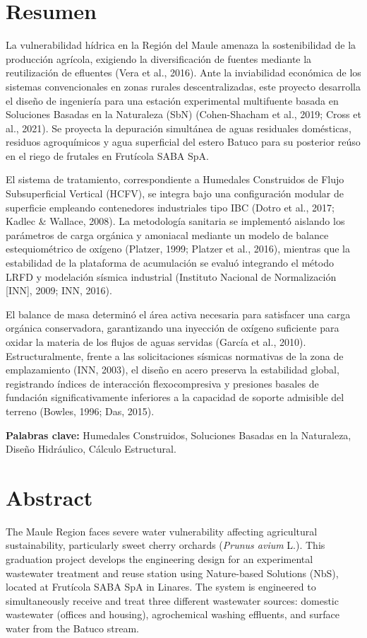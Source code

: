 \documentclass[12pt, letterpaper]{report}
\begin{document}
\chapter*{Resumen}

La vulnerabilidad hídrica en la Región del Maule amenaza la sostenibilidad de la producción agrícola, exigiendo la diversificación de fuentes mediante la reutilización de efluentes (Vera et al., 2016). Ante la inviabilidad económica de los sistemas convencionales en zonas rurales descentralizadas, este proyecto desarrolla el diseño de ingeniería para una estación experimental multifuente basada en Soluciones Basadas en la Naturaleza (SbN) (Cohen-Shacham et al., 2019; Cross et al., 2021). Se proyecta la depuración simultánea de aguas residuales domésticas, residuos agroquímicos y agua superficial del estero Batuco para su posterior reúso en el riego de frutales en Frutícola SABA SpA.

El sistema de tratamiento, correspondiente a Humedales Construidos de Flujo Subsuperficial Vertical (HCFV), se integra bajo una configuración modular de superficie empleando contenedores industriales tipo IBC (Dotro et al., 2017; Kadlec \& Wallace, 2008). La metodología sanitaria se implementó aislando los parámetros de carga orgánica y amoniacal mediante un modelo de balance estequiométrico de oxígeno (Platzer, 1999; Platzer et al., 2016), mientras que la estabilidad de la plataforma de acumulación se evaluó integrando el método LRFD y modelación sísmica industrial (Instituto Nacional de Normalización [INN], 2009; INN, 2016).

El balance de masa determinó el área activa necesaria para satisfacer una carga orgánica conservadora, garantizando una inyección de oxígeno suficiente para oxidar la materia de los flujos de aguas servidas (García et al., 2010). Estructuralmente, frente a las solicitaciones sísmicas normativas de la zona de emplazamiento (INN, 2003), el diseño en acero preserva la estabilidad global, registrando índices de interacción flexocompresiva y presiones basales de fundación significativamente inferiores a la capacidad de soporte admisible del terreno (Bowles, 1996; Das, 2015).

\vspace{0.5cm}
\noindent\textbf{Palabras clave:} Humedales Construidos, Soluciones Basadas en la Naturaleza, Diseño Hidráulico, Cálculo Estructural.

\newpage

\chapter*{Abstract}
The Maule Region faces severe water vulnerability affecting agricultural sustainability, particularly sweet cherry orchards (\textit{Prunus avium} L.). This graduation project develops the engineering design for an experimental wastewater treatment and reuse station using Nature-based Solutions (NbS), located at Frutícola SABA SpA in Linares. The system is engineered to simultaneously receive and treat three different wastewater sources: domestic wastewater (offices and housing), agrochemical washing effluents, and surface water from the Batuco stream.
\end{document}
